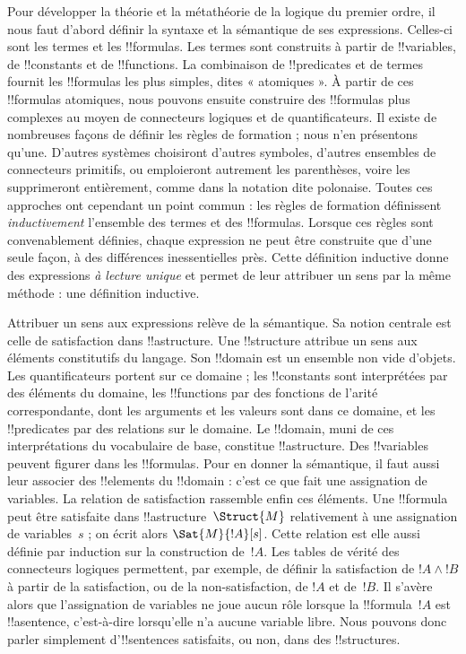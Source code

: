 \documentclass[../../../include/open-logic-section]{subfiles}
\begin{document}


Pour développer la théorie et la métathéorie de la logique du
premier ordre, il nous faut d'abord définir la syntaxe et la
sémantique de ses expressions. Celles-ci sont les termes et
les !!{formula}s. Les termes sont construits à partir de
!!{variable}s, de !!{constant}s et de !!{function}s.
La combinaison de !!{predicate}s et de termes fournit les
!!{formula}s les plus simples, dites « atomiques ». À partir de ces
!!{formula}s atomiques, nous pouvons ensuite construire des
!!{formula}s plus complexes au moyen de connecteurs logiques
et de quantificateurs. Il existe de nombreuses façons de
définir les règles de formation ; nous n'en présentons qu'une.
D'autres systèmes choisiront d'autres symboles, d'autres
ensembles de connecteurs primitifs, ou emploieront autrement
les parenthèses, voire les supprimeront entièrement, comme
dans la notation dite polonaise. Toutes ces approches ont
cependant un point commun : les règles de formation
définissent \emph{inductivement} l'ensemble des termes et des
!!{formula}s. Lorsque ces règles sont convenablement
définies, chaque expression ne peut être construite que
d'une seule façon, à des différences inessentielles près.
Cette définition inductive donne des expressions
\emph{à lecture unique} et permet de leur attribuer un sens
par la même méthode : une définition inductive.

Attribuer un sens aux expressions relève de la sémantique.
Sa notion centrale est celle de satisfaction dans
!!a{structure}. Une !!{structure} attribue un sens aux
éléments constitutifs du langage. Son !!{domain} est un
ensemble non vide d'objets. Les quantificateurs portent sur
ce domaine ; les !!{constant}s sont interprétées par des
éléments du domaine, les !!{function}s par des fonctions de
l'arité correspondante, dont les arguments et les valeurs sont
dans ce domaine, et les !!{predicate}s par des relations sur le domaine.
Le !!{domain}, muni de ces interprétations du vocabulaire de
base, constitue !!a{structure}. Des !!{variable}s peuvent
figurer dans les !!{formula}s. Pour en donner la sémantique,
il faut aussi leur associer des !!{element}s du !!{domain} :
c'est ce que fait une assignation de variables.
La relation de satisfaction rassemble enfin ces éléments.
Une !!{formula} peut être satisfaite dans
!!a{structure}~$\Struct{M}$ relativement à une assignation de
variables~$s$ ; on écrit alors $\Sat{M}{!A}[s]$.
Cette relation est elle aussi définie par induction sur la
construction de~$!A$. Les tables de vérité des connecteurs
logiques permettent, par exemple, de définir la satisfaction
de $!A\land !B$ à partir de la satisfaction, ou de la
non-satisfaction, de $!A$ et de~$!B$.
Il s'avère alors que l'assignation de variables ne joue
aucun rôle lorsque la !!{formula}~$!A$ est !!a{sentence},
c'est-à-dire lorsqu'elle n'a aucune variable libre.
Nous pouvons donc parler simplement d'!!{sentence}s
satisfaits, ou non, dans des !!{structure}s.
\end{document}
